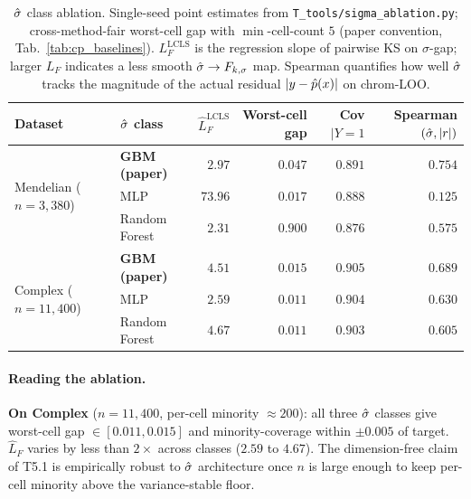 \begin{table}[h]
\centering
\small
\caption{$\hat{\sigma}$ class ablation. Single-seed point estimates from
\texttt{T\_tools/sigma\_ablation.py}; cross-method-fair worst-cell gap with
$\min$-cell-count $5$ (paper convention, Tab.~\ref{tab:cp_baselines}).
$L_F^{\mathrm{LCLS}}$ is the regression slope of pairwise KS on $\sigma$-gap;
larger $L_F$ indicates a less smooth $\hat{\sigma} \to F_{k,\sigma}$ map. Spearman
quantifies how well $\hat{\sigma}$ tracks the magnitude of the actual residual
$|y - \hat{p}(x)|$ on chrom-LOO.}
\label{tab:sigma_ablation}
\setlength{\tabcolsep}{4pt}
\begin{tabular}{llrrrr}
\toprule
Dataset & $\hat{\sigma}$ class & $\hat L_F^{\mathrm{LCLS}}$ & Worst-cell gap & Cov$|Y{=}1$ & Spearman$(\hat{\sigma}, |r|)$ \\
\midrule
\multirow{3}{*}{Mendelian ($n = 3{,}380$)}
 & \textbf{GBM (paper)}            & $2.97$  & $0.047$ & $0.891$ & $0.754$ \\
 & MLP                              & $73.96$ & $0.017$ & $0.888$ & $0.125$ \\
 & Random Forest                    & $2.31$  & $0.900$ & $0.876$ & $0.575$ \\
\midrule
\multirow{3}{*}{Complex ($n = 11{,}400$)}
 & \textbf{GBM (paper)}            & $4.51$  & $0.015$ & $0.905$ & $0.689$ \\
 & MLP                              & $2.59$  & $0.011$ & $0.904$ & $0.630$ \\
 & Random Forest                    & $4.67$  & $0.011$ & $0.903$ & $0.605$ \\
\bottomrule
\end{tabular}
\end{table}

\paragraph{Reading the ablation.}
\textbf{On Complex} ($n = 11{,}400$, per-cell minority $\approx 200$): all three
$\hat{\sigma}$ classes give worst-cell gap $\in [0.011, 0.015]$ and minority-coverage
within $\pm 0.005$ of target. $\hat L_F$ varies by less than $2\times$ across
classes ($2.59$ to $4.67$). The dimension-free claim of T5.1 is empirically
robust to $\hat{\sigma}$ architecture once $n$ is large enough to keep per-cell
minority above the variance-stable floor.

